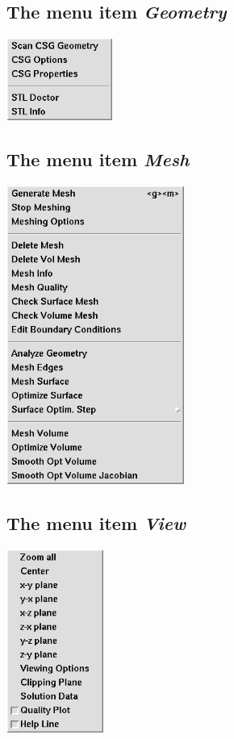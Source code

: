\documentclass[12pt]{book}
\begin{document}
\subsection{The menu item {\em Geometry}}
\includegraphics[height=2.7cm]{pictures/menugeometry} 

\subsection{The menu item {\em Mesh}}
\includegraphics[height=9.8cm]{pictures/menumesh} 

\subsection{The menu item {\em View}}
\includegraphics[height=6.0cm]{pictures/menuview} 
\end{document}
